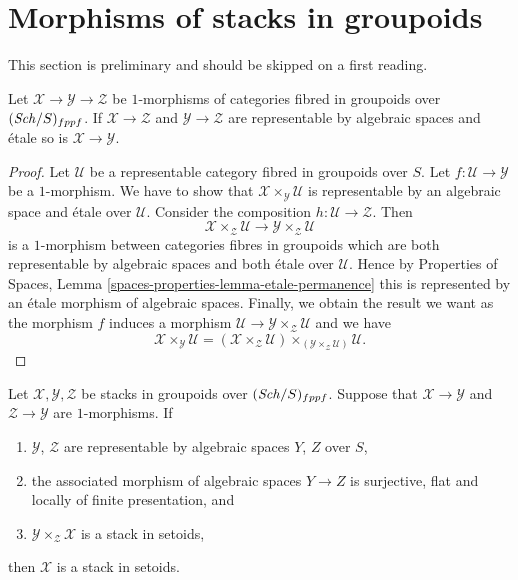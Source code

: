 \section{Morphisms of stacks in groupoids}
\label{section-1-morphisms}

\noindent
This section is preliminary and should be skipped on a first reading.

\begin{lemma}
\label{lemma-etale-permanence}
Let $\mathcal{X} \to \mathcal{Y} \to \mathcal{Z}$
be $1$-morphisms of categories fibred in groupoids over
$(\mathit{Sch}/S)_{fppf}$.
If $\mathcal{X} \to \mathcal{Z}$ and $\mathcal{Y} \to \mathcal{Z}$ are
representable by algebraic spaces and \'etale so is
$\mathcal{X} \to \mathcal{Y}$.
\end{lemma}

\begin{proof}
Let $\mathcal{U}$ be a representable category fibred in groupoids over $S$.
Let $f : \mathcal{U} \to \mathcal{Y}$ be a $1$-morphism. We have to show that
$\mathcal{X} \times_\mathcal{Y} \mathcal{U}$ is representable by an
algebraic space and \'etale over $\mathcal{U}$.
Consider the composition $h : \mathcal{U} \to \mathcal{Z}$. Then
$$
\mathcal{X} \times_\mathcal{Z} \mathcal{U}
\longrightarrow
\mathcal{Y} \times_\mathcal{Z} \mathcal{U}
$$
is a $1$-morphism between categories fibres in groupoids which are both
representable by algebraic spaces and both \'etale over $\mathcal{U}$.
Hence by
Properties of Spaces, Lemma \ref{spaces-properties-lemma-etale-permanence}
this is represented by an \'etale morphism of algebraic spaces.
Finally, we obtain the result we want as the morphism $f$ induces
a morphism $\mathcal{U} \to \mathcal{Y} \times_\mathcal{Z} \mathcal{U}$
and we have
$$
\mathcal{X} \times_\mathcal{Y} \mathcal{U} =
(\mathcal{X} \times_\mathcal{Z} \mathcal{U})
\times_{(\mathcal{Y} \times_\mathcal{Z} \mathcal{U})}
\mathcal{U}.
$$
\end{proof}

\begin{lemma}
\label{lemma-stack-in-setoids-descent}
Let $\mathcal{X}, \mathcal{Y}, \mathcal{Z}$ be stacks in groupoids
over $(\mathit{Sch}/S)_{fppf}$. Suppose that $\mathcal{X} \to \mathcal{Y}$
and $\mathcal{Z} \to \mathcal{Y}$ are $1$-morphisms.
If
\begin{enumerate}
\item $\mathcal{Y}$, $\mathcal{Z}$ are representable by algebraic spaces
$Y$, $Z$ over $S$,
\item the associated morphism of algebraic spaces $Y \to Z$ is surjective,
flat and locally of finite presentation, and
\item $\mathcal{Y} \times_\mathcal{Z} \mathcal{X}$ is a stack in
setoids,
\end{enumerate}
then $\mathcal{X}$ is a stack in setoids.
\end{lemma}

